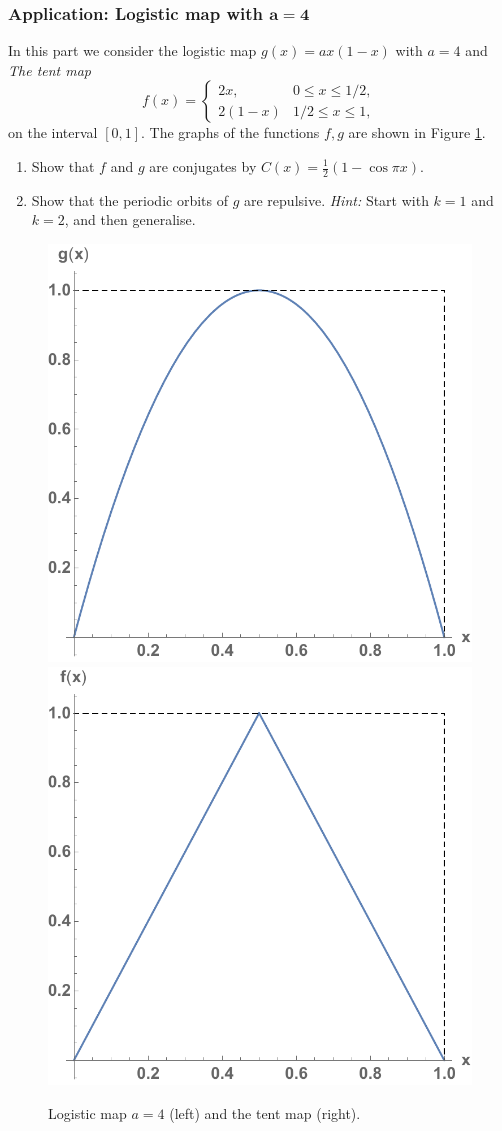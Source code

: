 \documentclass{article}
\begin{document}
\begin{question}
  \subsubsection*{Application: Logistic map with $\bm{a=4}$}
  \noindent
  In this part we consider the logistic map $g(x) = ax(1-x)$ with $a=4$ and \textit{The tent map}
  \begin{equation}
     f(x) =
     \begin{cases}
       2x,& 0 \leqslant x \leqslant 1/2,\\
       2(1-x) & 1/2 \leqslant x \leqslant 1,
     \end{cases}
  \end{equation}
  on the interval $[0,1]$. The graphs of the functions $f,g$ are shown in  Figure \ref{fig:Tent}.
 \begin{enumerate}[label=(\alph*),resume]
    \item Show that $f$ and $g$ are conjugates by $C(x) = \frac{1}{2}(1-\cos \pi x)$.
    \item Show that the periodic orbits of $g$ are repulsive. \textit{Hint:} Start with $k=1$ and $k=2$, and then generalise.
 \end{enumerate}
 
 \begin{figure}[h]
 \centering
 \includegraphics[width=.45\textwidth]{Logistic} 
 \hspace{.07\textwidth}
 \includegraphics[width=.45\textwidth]{Tent}

 \caption{Logistic map $a=4$ (left) and the tent map (right).}
 \label{fig:Tent}
 \end{figure}
   
\end{question}




 
\end{document}
